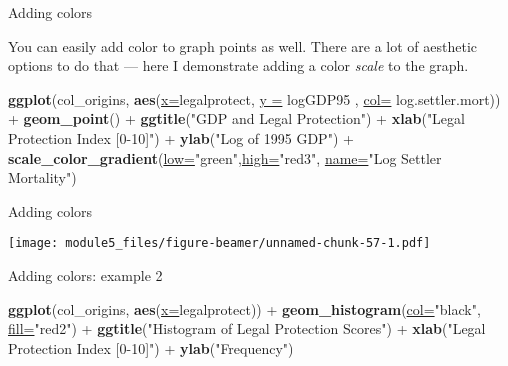 \documentclass[ignorenonframetext,]{beamer}
\newenvironment{Shaded}{\begin{snugshade}}{\end{snugshade}}
\newcommand{\KeywordTok}[1]{\textcolor[rgb]{0.26,0.66,0.93}{\textbf{#1}}}
\newcommand{\DataTypeTok}[1]{\textcolor[rgb]{0.74,0.68,0.62}{\underline{#1}}}
\newcommand{\StringTok}[1]{\textcolor[rgb]{0.02,0.61,0.04}{#1}}
\newcommand{\OperatorTok}[1]{\textcolor[rgb]{0.74,0.68,0.62}{#1}}
\newcommand{\NormalTok}[1]{\textcolor[rgb]{0.74,0.68,0.62}{#1}}
\begin{document}
\begin{frame}[fragile]{Adding colors}

You can easily add color to graph points as well. There are a lot of
aesthetic options to do that --- here I demonstrate adding a color
\emph{scale} to the graph.

\begin{Shaded}
\begin{Highlighting}[]
\KeywordTok{ggplot}\NormalTok{(col_origins, }\KeywordTok{aes}\NormalTok{(}\DataTypeTok{x=}\NormalTok{legalprotect, }
  \DataTypeTok{y =}\NormalTok{ logGDP95 , }\DataTypeTok{col=}\NormalTok{ log.settler.mort)) }\OperatorTok{+}
\StringTok{  }\KeywordTok{geom_point}\NormalTok{() }\OperatorTok{+}\StringTok{ }
\StringTok{  }\KeywordTok{ggtitle}\NormalTok{(}\StringTok{"GDP and Legal Protection"}\NormalTok{) }\OperatorTok{+}
\StringTok{  }\KeywordTok{xlab}\NormalTok{(}\StringTok{"Legal Protection Index [0-10]"}\NormalTok{) }\OperatorTok{+}\StringTok{ }
\StringTok{  }\KeywordTok{ylab}\NormalTok{(}\StringTok{"Log of 1995 GDP"}\NormalTok{) }\OperatorTok{+}\StringTok{ }
\StringTok{  }\KeywordTok{scale_color_gradient}\NormalTok{(}\DataTypeTok{low=}\StringTok{"green"}\NormalTok{,}\DataTypeTok{high=}\StringTok{"red3"}\NormalTok{, }
                       \DataTypeTok{name=}\StringTok{"Log Settler Mortality"}\NormalTok{)}
\end{Highlighting}
\end{Shaded}

\end{frame}

\begin{frame}{Adding colors}

\texttt{[image: module5\_files/figure-beamer/unnamed-chunk-57-1.pdf]}

\end{frame}

\begin{frame}[fragile]{Adding colors: example 2}

\begin{Shaded}
\begin{Highlighting}[]
\KeywordTok{ggplot}\NormalTok{(col_origins, }\KeywordTok{aes}\NormalTok{(}\DataTypeTok{x=}\NormalTok{legalprotect)) }\OperatorTok{+}\StringTok{ }
\StringTok{  }\KeywordTok{geom_histogram}\NormalTok{(}\DataTypeTok{col=}\StringTok{"black"}\NormalTok{, }\DataTypeTok{fill=}\StringTok{"red2"}\NormalTok{) }\OperatorTok{+}\StringTok{ }
\StringTok{  }\KeywordTok{ggtitle}\NormalTok{(}\StringTok{"Histogram of Legal Protection Scores"}\NormalTok{) }\OperatorTok{+}
\StringTok{  }\KeywordTok{xlab}\NormalTok{(}\StringTok{"Legal Protection Index [0-10]"}\NormalTok{) }\OperatorTok{+}
\StringTok{  }\KeywordTok{ylab}\NormalTok{(}\StringTok{"Frequency"}\NormalTok{) }
\end{Highlighting}
\end{Shaded}

\end{frame}
\end{document}
